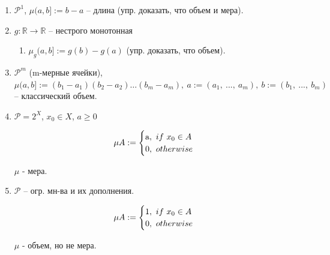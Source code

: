 \begin{example}
    \begin{enumerate}
        \item $\mathcal{P}^1$,   \;\; $\mu (a, b] := b - a$ -- длина (упр. доказать, что объем и мера).
        \item {
            $g: \mathbb{R} \rightarrow \mathbb{R}$ -- нестрого монотонная

            \begin{enumerate}
                \item $\mu_{g}(a, b] := g(b) - g(a)$ (упр. доказать, что объем).
            \end{enumerate}
        }
        \item $\mathcal{P}^m$ (m-мерные ячейки), \;\; $\mu (a, b] := (b_1 - a_1)(b_2 - a_2) \dots (b_m - a_m), \ a := (a_1, \ ..., \ a_m), \ b := (b_1, \ ..., \ b_m)$ -- классический объем.
        \item {
            $\mathcal{P} = 2^X$, \;\; $x_0 \in X$, \;\; $a \geq 0$
            
            \begin{equation}
                \mu A := 
                \begin{cases}
                    $a$, \ if \  x_{0} \in A \\
                    $0$, \ otherwise
                \end{cases}                
            \end{equation}

            $\mu$ - мера.
        }
        \item {
            $\mathcal{P}$ -- огр. мн-ва и их дополнения.
            
            \begin{equation}
                \mu A := 
                \begin{cases}
                    $1$, \ if \  x_{0} \in A \\
                    $0$, \ otherwise
                \end{cases}                
            \end{equation}

            $\mu$ - объем, но не мера.
        }
    \end{enumerate}
\end{example}

